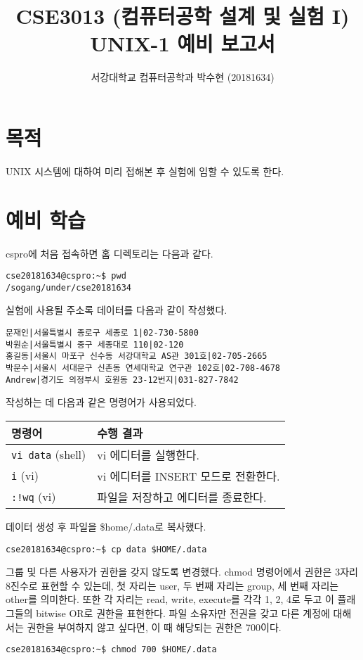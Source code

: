 \documentclass[runningheads]{../../../llncs}
\begin{document}
\title{CSE3013 (컴퓨터공학 설계 및 실험 I) \space \newline UNIX-1 예비 보고서}
\author{서강대학교 컴퓨터공학과 박수현 (20181634)}
\maketitle

\section{목적}
UNIX 시스템에 대하여 미리 접해본 후 실험에 임할 수 있도록 한다.

\section{예비 학습}
cspro에 처음 접속하면 홈 디렉토리는 다음과 같다.
\begin{verbatim}
cse20181634@cspro:~$ pwd
/sogang/under/cse20181634
\end{verbatim}

실험에 사용될 주소록 데이터를 다음과 같이 작성했다.
\begin{verbatim}
문재인|서울특별시 종로구 세종로 1|02-730-5800
박원순|서울특별시 중구 세종대로 110|02-120
홍길동|서울시 마포구 신수동 서강대학교 AS관 301호|02-705-2665
박문수|서울시 서대문구 신촌동 연세대학교 연구관 102호|02-708-4678
Andrew|경기도 의정부시 호원동 23-12번지|031-827-7842
\end{verbatim}

작성하는 데 다음과 같은 명령어가 사용되었다.

\begin{tabular}{l|l}
	명령어 & 수행 결과 \\
	\hline
	\texttt{vi data} (shell) & vi 에디터를 실행한다. \\
	\texttt{i} (vi) & vi 에디터를 INSERT 모드로 전환한다. \\
	\texttt{:!wq} (vi) & 파일을 저장하고 에디터를 종료한다.
\end{tabular}

데이터 생성 후 파일을 \$home/.data로 복사했다.

\begin{verbatim}
cse20181634@cspro:~$ cp data $HOME/.data
\end{verbatim}

그룹 및 다른 사용자가 권한을 갖지 않도록 변경했다. chmod 명령어에서 권한은 3자리 8진수로 표현할 수 있는데, 첫 자리는 user, 두 번째 자리는 group, 세 번째 자리는 other를 의미한다. 또한 각 자리는 read, write, execute를 각각 1, 2, 4로 두고 이 플래그들의 bitwise OR로 권한을 표현한다. 파일 소유자만 전권을 갖고 다른 계정에 대해서는 권한을 부여하지 않고 싶다면, 이 때 해당되는 권한은 700이다.
\begin{verbatim}
cse20181634@cspro:~$ chmod 700 $HOME/.data
\end{verbatim}
\end{document}
